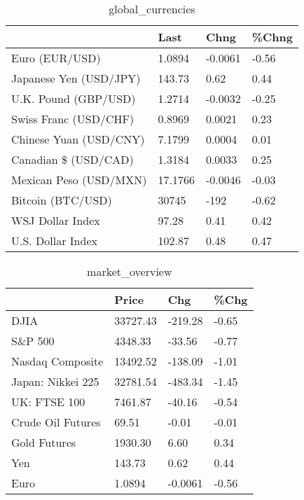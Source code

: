 \documentclass{article}%
\begin{document}
%


\begin{table}[htbp]%
\caption{global\_currencies}%
\centering%
\begin{adjustbox}{width=1\textwidth}%
\begin{tabular}{llll}
\toprule
                       &    Last &    Chng & \%Chng \\
\midrule
        Euro (EUR/USD) &  1.0894 & -0.0061 & -0.56 \\
Japanese Yen (USD/JPY) &  143.73 &    0.62 &  0.44 \\
  U.K. Pound (GBP/USD) &  1.2714 & -0.0032 & -0.25 \\
 Swiss Franc (USD/CHF) &  0.8969 &  0.0021 &  0.23 \\
Chinese Yuan (USD/CNY) &  7.1799 &  0.0004 &  0.01 \\
  Canadian \$ (USD/CAD) &  1.3184 &  0.0033 &  0.25 \\
Mexican Peso (USD/MXN) & 17.1766 & -0.0046 & -0.03 \\
     Bitcoin (BTC/USD) &   30745 &    -192 & -0.62 \\
      WSJ Dollar Index &   97.28 &    0.41 &  0.42 \\
     U.S. Dollar Index &  102.87 &    0.48 &  0.47 \\
\bottomrule
\end{tabular}
%
\end{adjustbox}%
\end{table}

%


\begin{table}[htbp]%
\caption{market\_overview}%
\centering%
\begin{adjustbox}{width=1\textwidth}%
\begin{tabular}{llll}
\toprule
                  &    Price &     Chg &  \%Chg \\
\midrule
             DJIA & 33727.43 & -219.28 & -0.65 \\
          S\&P 500 &  4348.33 &  -33.56 & -0.77 \\
 Nasdaq Composite & 13492.52 & -138.09 & -1.01 \\
Japan: Nikkei 225 & 32781.54 & -483.34 & -1.45 \\
     UK: FTSE 100 &  7461.87 &  -40.16 & -0.54 \\
Crude Oil Futures &    69.51 &   -0.01 & -0.01 \\
     Gold Futures &  1930.30 &    6.60 &  0.34 \\
              Yen &   143.73 &    0.62 &  0.44 \\
             Euro &   1.0894 & -0.0061 & -0.56 \\
\bottomrule
\end{tabular}
%
\end{adjustbox}%
\end{table}

%
\end{document}
